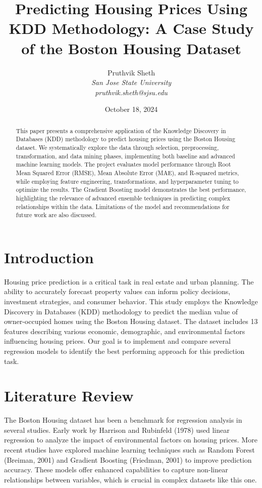 \documentclass[12pt]{article}
\title{Predicting Housing Prices Using KDD Methodology: A Case Study of the Boston Housing Dataset}
\author{Pruthvik Sheth \\
\textit{San Jose State University} \\
\textit{pruthvik.sheth@sjsu.edu}}
\date{October 18, 2024}
\begin{document}
\maketitle

\begin{abstract}
This paper presents a comprehensive application of the Knowledge Discovery in Databases (KDD) methodology to predict housing prices using the Boston Housing dataset. We systematically explore the data through selection, preprocessing, transformation, and data mining phases, implementing both baseline and advanced machine learning models. The project evaluates model performance through Root Mean Squared Error (RMSE), Mean Absolute Error (MAE), and R-squared metrics, while employing feature engineering, transformations, and hyperparameter tuning to optimize the results. The Gradient Boosting model demonstrates the best performance, highlighting the relevance of advanced ensemble techniques in predicting complex relationships within the data. Limitations of the model and recommendations for future work are also discussed.
\end{abstract}

\section{Introduction}
Housing price prediction is a critical task in real estate and urban planning. The ability to accurately forecast property values can inform policy decisions, investment strategies, and consumer behavior. This study employs the Knowledge Discovery in Databases (KDD) methodology to predict the median value of owner-occupied homes using the Boston Housing dataset. The dataset includes 13 features describing various economic, demographic, and environmental factors influencing housing prices. Our goal is to implement and compare several regression models to identify the best performing approach for this prediction task.

\section{Literature Review}
The Boston Housing dataset has been a benchmark for regression analysis in several studies. Early work by Harrison and Rubinfeld (1978) used linear regression to analyze the impact of environmental factors on housing prices. More recent studies have explored machine learning techniques such as Random Forest (Breiman, 2001) and Gradient Boosting (Friedman, 2001) to improve prediction accuracy. These models offer enhanced capabilities to capture non-linear relationships between variables, which is crucial in complex datasets like this one.
\end{document}
